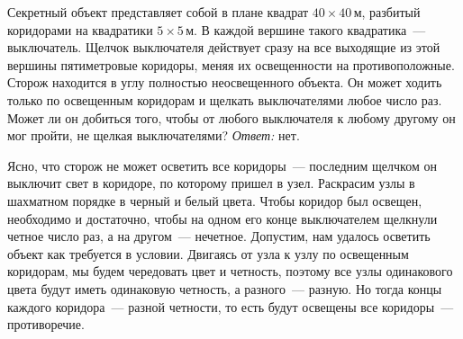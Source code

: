 \problem
Секретный объект представляет собой в плане квадрат $40 \times 40\,\text{м}$,
разбитый коридорами на квадратики $5 \times 5\,\text{м}$.
В каждой вершине такого квадратика~--- выключатель.
Щелчок выключателя действует сразу на все выходящие из этой вершины
пятиметровые коридоры, меняя их освещенности на противоположные.
Сторож находится в углу полностью неосвещенного объекта.
Он может ходить только по освещенным коридорам и щелкать выключателями любое
число раз.
Может ли он добиться того, чтобы от любого выключателя к любому другому он мог
пройти, не щелкая выключателями?
\solution
\emph{Ответ:} нет.
\par
Ясно, что сторож не может осветить все коридоры~--- последним щелчком он
выключит свет в коридоре, по которому пришел в узел.
Раскрасим узлы в шахматном порядке в черный и белый цвета.
Чтобы коридор был освещен, необходимо и достаточно, чтобы на одном его конце
выключателем щелкнули четное число раз, а на другом~--- нечетное.
Допустим, нам удалось осветить объект как требуется в условии.
Двигаясь от узла к узлу по освещенным коридорам, мы будем чередовать цвет и
четность, поэтому все узлы одинакового цвета будут иметь одинаковую четность, а
разного~--- разную.
Но тогда концы каждого коридора~--- разной четности, то есть будут освещены все
коридоры~--- противоречие.
\endproblem
